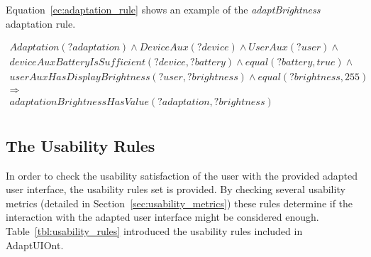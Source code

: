 Equation~\ref{ec:adaptation_rule} shows an example of the \textit{adaptBrightness} 
adaptation rule.

\footnotesize
\begin{equation} \label{ec:adaptation_rule}
  \begin{align*} 
  Adaptation(?adaptation) ∧ DeviceAux(?device) ∧ UserAux(?user) ∧ \\
  deviceAuxBatteryIsSufficient(?device, ?battery) ∧ equal(?battery, true) ∧ \\
  userAuxHasDisplayBrightness(?user, ?brightness) ∧ equal(?brightness, 255)\\ 
  \Rightarrow \\
  adaptationBrightnessHasValue(?adaptation, ?brightness)\\
  \end{align*}
\end{equation}
\normalsize


\subsection{The Usability Rules}
In order to check the usability satisfaction of the user with the provided
adapted user interface, the usability rules set is provided. By checking several
usability metrics (detailed in Section~\ref{sec:usability_metrics}) these rules
determine if the interaction with the adapted user interface might be considered
enough. Table~\ref{tbl:usability_rules} introduced the usability rules included
in AdaptUIOnt.

